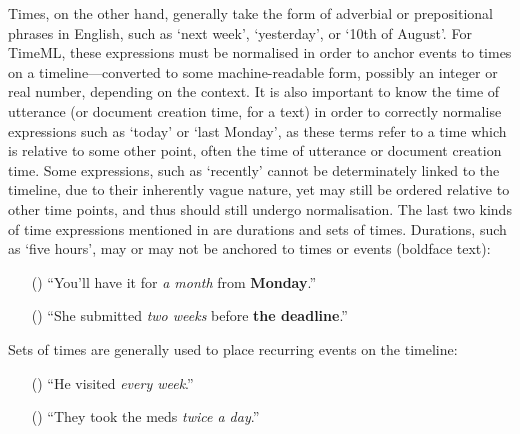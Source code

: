 \documentclass[a4paper,12pt,leqno]{article}
\newcommand{\ipp}{(\refstepcounter{equation}\theequation)}
\begin{document}
Times, on the other hand, generally take the form of adverbial or prepositional phrases in English, such as `next week', `yesterday', or `10th of August'. For TimeML, these expressions must be normalised in order to anchor events to times on a timeline---converted to some machine-readable form, possibly an integer or real number, depending on the context. It is also important to know the time of utterance (or document creation time, for a text) in order to correctly normalise expressions such as `today' or `last Monday', as these terms refer to a time which is relative to some other point, often the time of utterance or document creation time. Some expressions, such as `recently' cannot be determinately linked to the timeline, due to their inherently vague nature, yet may still be ordered relative to other time points, and thus should still undergo normalisation. The last two kinds of time expressions mentioned in \citet{Pustejovsky2005} are durations and sets of times. Durations, such as `five hours', may or may not be anchored to times or events (boldface text):
\begin{itemize}
	\item[\ipp] ``You'll have it for \textit{a month} from \textbf{Monday}.''
	\item[\ipp] ``She submitted \textit{two weeks} before \textbf{the deadline}.''
\end{itemize}
Sets of times are generally used to place recurring events on the timeline:
\begin{itemize}
	\item[\ipp] ``He visited \textit{every week}.''
	\item[\ipp] ``They took the meds \textit{twice a day}.''
\end{itemize}
% 
% 
\end{document}
